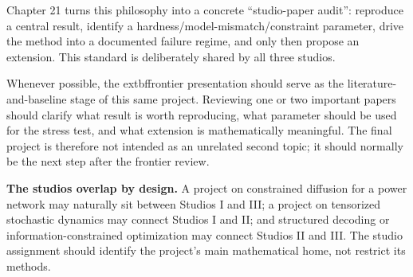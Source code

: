 \documentclass[11pt]{article}
\newcommand{\keybox}[1]{%
  \begin{center}
  \setlength{\fboxsep}{8pt}%
  \colorbox{UAlight}{\parbox{0.93\linewidth}{#1}}
  \end{center}}
\begin{document}
Chapter 21 turns this philosophy into a concrete ``studio-paper audit'': reproduce a central result, identify a hardness/model-mismatch/constraint parameter, drive the method into a documented failure regime, and only then propose an extension. This standard is deliberately shared by all three studios.

Whenever possible, the 	extbf{frontier presentation should serve as the literature-and-baseline stage of this same project}. Reviewing one or two important papers should clarify what result is worth reproducing, what parameter should be used for the stress test, and what extension is mathematically meaningful. The final project is therefore not intended as an unrelated second topic; it should normally be the next step after the frontier review.

\keybox{\textbf{The studios overlap by design.} A project on constrained diffusion for a power network may naturally sit between Studios I and III; a project on tensorized stochastic dynamics may connect Studios I and II; and structured decoding or information-constrained optimization may connect Studios II and III. The studio assignment should identify the project's main mathematical home, not restrict its methods.}
\end{document}
